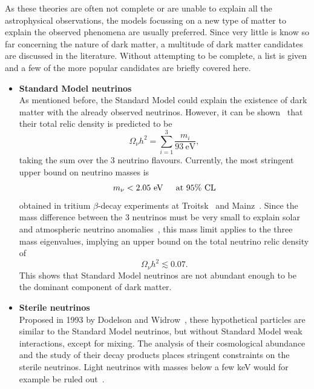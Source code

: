 As these theories are often not complete or are unable to explain all the astrophysical observations, the models focussing on a new type of matter to explain the observed phenomena are usually preferred. Since very little is know so far concerning the nature of dark matter, a multitude of dark matter candidates are discussed in the literature. Without attempting to be complete, a list is given and a few of the more popular candidates are briefly covered here.

\begin{itemize}
 \item[] \textbf{Standard Model neutrinos}\\
	As mentioned before, the Standard Model could explain the existence of dark matter with the already observed neutrinos. However, it can be shown~\cite{Bergstrom:2000pn} that their total relic density is predicted to be 
	\begin{equation}
	 \Omega_{\nu}h^2 = \sum_{i = 1}^3 \frac{m_i}{93\ \mathrm{eV}},
	\end{equation}
	taking the sum over the 3 neutrino flavours. Currently, the most stringent upper bound on neutrino masses is
	\begin{equation}
	 m_{\nu} < 2.05\ \text{eV \hspace{.3cm} at 95\% CL}
	\end{equation}
	obtained in tritium $\beta$-decay experiments at Troitsk~\cite{Lobashev:2003kt,Aseev:2011dq} and Mainz~\cite{Kraus:2004zw}. Since the mass difference between the 3 neutrinos must be very small to explain solar and atmospheric neutrino anomalies~\cite{GonzalezGarcia:2002dz}, this mass limit applies to the three mass eigenvalues, implying an upper bound on the total neutrino relic density of 
	\begin{equation}
	  \Omega_{\nu}h^2 \lesssim 0.07.
	\end{equation}
	This shows that Standard Model neutrinos are not abundant enough to be the dominant component of dark matter.
	
 \item[] \textbf{Sterile neutrinos}\\
         Proposed in 1993 by Dodelson and Widrow~\cite{Dodelson:1993je}, these hypothetical particles are similar to the Standard Model neutrinos, but without Standard Model weak interactions, except for mixing. The analysis of their cosmological abundance and the study of their decay products places stringent constraints on the sterile neutrinos. Light neutrinos with masses below a few keV would for example be ruled out~\cite{Yoshida:2003rm}.
         

\end{itemize}
